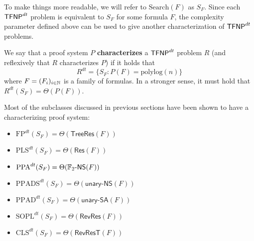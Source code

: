 To make things more readable, we will refer to $\mathrm{Search}(F)$ as $S_F$. Since each $\mathsf{TFNP}^{dt}$ problem is equivalent to $S_F$ for some formula $F$, the complexity parameter defined above can be used to give another characterization of $\mathsf{TFNP}^{dt}$ problems.

\begin{definition}
 We say that a proof system $P$ \textbf{characterizes} a $\mathsf{TFNP}^{dt}$ problem $R$ (and reflexively that $R$ characterizes $P$) if it holds that \[R^{dt} = \{S_F : P(F) = \mathrm{polylog}(n)\}\]
 where $F = (F_i)_{i \in \mathbb{N}}$ is a family of formulas. In a stronger sense, it must hold that $R^{dt}(S_F) = \Theta(P(F))$. 
\end{definition}

Most of the \TFNP subclasses discussed in previous sections have been shown to have a characterizing proof system:
\begin{itemize}
    \item $\mathrm{FP}^{dt}(S_F) = \Theta(\mathsf{TreeRes}(F))$ \cite{search_problems_dt_model}
    \item $\mathrm{PLS}^{dt}(S_F) = \Theta(\mathsf{Res}(F))$  \cite{approx_counting}
    \item $\mathrm{PPA}^{dt}(S_F) = \Theta(\mathbb{F}_2\textsf{-NS}(F))$ \cite{adventures_monotone_tfnp}
    \item $\mathrm{PPADS}^{dt}(S_F) = \Theta(\textsf{unary-NS}(F))$ \cite{separations_proof_complexity}
    \item $\mathrm{PPAD}^{dt}(S_F) = \Theta(\textsf{unary-SA}(F))$ \cite{separations_proof_complexity}
    \item $\mathrm{SOPL}^{dt}(S_F) = \Theta(\mathsf{RevRes}(F))$ \cite{separations_proof_complexity}
    \item $\mathrm{CLS}^{dt}(S_F) = \Theta(\mathsf{RevResT}(F))$ \cite{separations_proof_complexity}
\end{itemize}

\newpage

